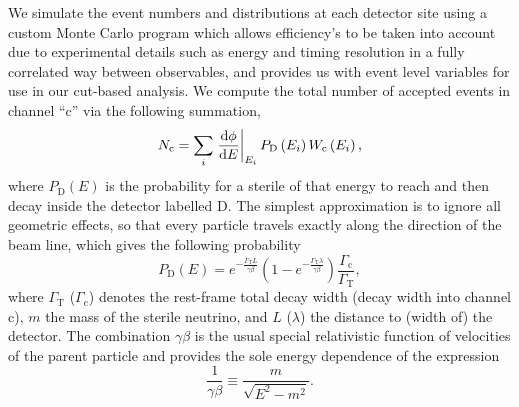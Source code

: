 \documentclass[11pt, a4paper]{article}
\def\ster{\ensuremath N}
\begin{document}
We simulate the event numbers and distributions at each detector site using a custom
Monte Carlo program which allows efficiency's to be taken into account due to
experimental details such as energy and timing resolution in a fully correlated
way between observables, and provides us with event level variables for use in
our cut-based analysis. We compute the total number of accepted events in
channel ``$\text{c}$'' via the following summation,
%
\[ \ster_\text{c} = \sum_{i} \left .
\frac{\mathrm{d}\phi}{\mathrm{d}E}\right|_{E_i} P_\text{D}\left(E_i\right)
W_\text{c}\left(E_i\right),  \]
%
where $P_\text{D}(E)$ is the probability for a sterile of that energy to reach
and then decay inside the detector labelled $\text{D}$. The simplest
approximation is to ignore all geometric effects, so that every particle
travels exactly along the direction of the beam line, which gives the following
probability 
%
\[ P_\text{D}\left(E\right) = e^{-\frac{\Gamma_\text{T}L}{\gamma\beta}}\left(
1-
e^{-\frac{\Gamma_\text{T}\lambda}{\gamma\beta}}\right)\frac{\Gamma_\text{c}}{\Gamma_\text{T}},
\label{eq:prob} \]
%
where $\Gamma_\text{T}$ ($\Gamma_\text{c}$) denotes the rest-frame total decay
width (decay width into channel $\text{c}$), $m$ the mass of the sterile
neutrino, and $L$ ($\lambda$) the distance to (width of) the detector. The
combination $\gamma\beta$ is the usual special relativistic function of
velocities of the parent particle and provides the sole energy dependence of
the expression
%
\[   \frac{1}{\gamma\beta} \equiv \frac{m}{\sqrt{E^2-m^2}}. \]
%
\end{document}

